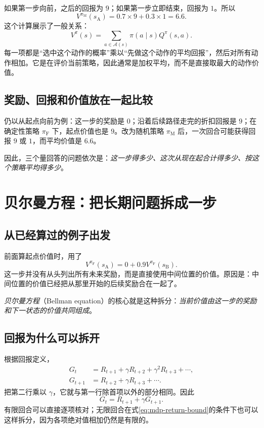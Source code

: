 \documentclass[UTF8,12pt,a4paper,fontset=fandol]{ctexart}
\begin{document}
如果第一步向前，之后的回报为 $9$；如果第一步立即结束，回报为 $1$。所以
\[
  V^{\pi_{\mathrm M}}(s_{\mathrm A})=0.7\times9+0.3\times1=6.6.
\]
这个计算展示了一般关系：
\begin{equation}
  V^\pi(s)=\sum_{a\in\mathcal A(s)}\pi(a\mid s)Q^\pi(s,a).
  \label{eq:mdp-vq}
\end{equation}
每一项都是“选中这个动作的概率”乘以“先做这个动作的平均回报”，然后对所有动作相加。它是在评价当前策略，因此通常是加权平均，而不是直接取最大的动作价值。

\subsection{奖励、回报和价值放在一起比较}

仍以从起点向前为例：这一步的奖励是 $0$；沿着后续路径走完的折扣回报是 $9$；在确定性策略 $\pi_{\mathrm F}$ 下，起点价值也是 $9$。改为随机策略 $\pi_{\mathrm M}$ 后，一次回合可能获得回报 $9$ 或 $1$，而平均价值是 $6.6$。

因此，三个量回答的问题依次是：\emph{这一步得多少、这次从现在起合计得多少、按这个策略平均得多少}。

\section{贝尔曼方程：把长期问题拆成一步}
\label{sec:mdp-bellman}

\subsection{从已经算过的例子出发}

前面算起点价值时，用了
\[
  V^{\pi_{\mathrm F}}(s_{\mathrm A})
  =0+0.9V^{\pi_{\mathrm F}}(s_{\mathrm B}).
\]
这一步并没有从头列出所有未来奖励，而是直接使用中间位置的价值。原因是：中间位置的价值已经把从那里开始的后续奖励合在一起了。

\emph{贝尔曼方程}（Bellman equation）的核心就是这种拆分：\emph{当前价值由这一步的奖励和下一状态的价值共同组成}。

\subsection{回报为什么可以拆开}

根据回报定义，
\begin{align*}
  G_t&=R_{t+1}+\gamma R_{t+2}+\gamma^2R_{t+3}+\cdots,\\
  G_{t+1}&=R_{t+2}+\gamma R_{t+3}+\cdots.
\end{align*}
把第二行乘以 $\gamma$，它就与第一行除首项以外的部分相同。因此
\begin{equation}
  G_t=R_{t+1}+\gamma G_{t+1}.
  \label{eq:mdp-return-recursion}
\end{equation}
有限回合可以直接逐项核对；无限回合在式\eqref{eq:mdp-return-bound}的条件下也可以这样拆分，因为各项绝对值相加仍然是有限的。
\end{document}
